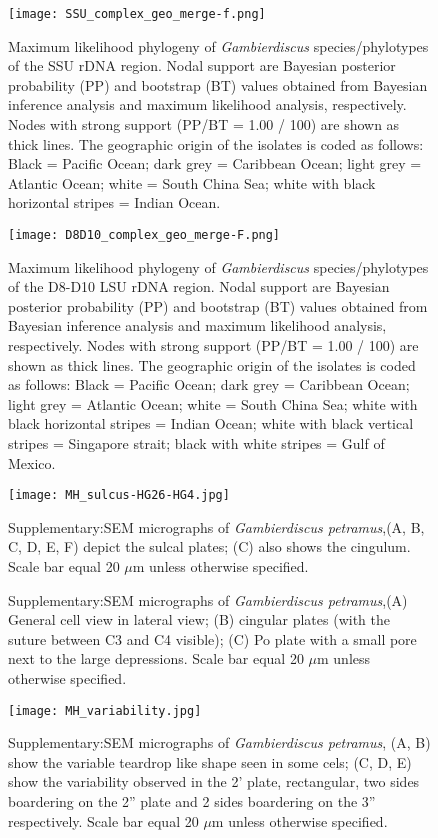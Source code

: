 \documentclass[12pt]{article}
\begin{document}
\begin{figure} 
\texttt{[image: SSU\_complex\_geo\_merge-f.png]} 
\caption{Maximum likelihood phylogeny of \textit{Gambierdiscus} species/phylotypes of the SSU rDNA region. Nodal support are Bayesian posterior probability (PP) and bootstrap (BT) values obtained from Bayesian inference analysis and maximum likelihood analysis, respectively. Nodes with strong support (PP/BT = 1.00 / 100) are shown as thick lines. The geographic origin of the isolates is coded as follows: Black = Pacific Ocean; dark grey = Caribbean Ocean; light grey = Atlantic Ocean; white = South China Sea; white with black horizontal stripes = Indian Ocean.}
\label{fig:HGSSU} 
\end{figure} 
\FloatBarrier 

\newpage
\begin{figure} 
\texttt{[image: D8D10\_complex\_geo\_merge-F.png]} 
\caption{Maximum likelihood phylogeny of \textit{Gambierdiscus} species/phylotypes of the D8-D10 LSU rDNA region. Nodal support are Bayesian posterior probability (PP) and bootstrap (BT) values obtained from Bayesian inference analysis and maximum likelihood analysis, respectively. Nodes with strong support (PP/BT = 1.00 / 100) are shown as thick lines. The geographic origin of the isolates is coded as follows: Black = Pacific Ocean; dark grey = Caribbean Ocean; light grey = Atlantic Ocean; white = South China Sea; white with black horizontal stripes = Indian Ocean; white with black vertical stripes = Singapore strait; black with white stripes = Gulf of Mexico.} 
\label{fig:HGD8D10}
\end{figure} 
\FloatBarrier 
\FloatBarrier 
\begin{figure} 
\texttt{[image: MH\_sulcus-HG26-HG4.jpg]} 
\caption{Supplementary:SEM micrographs of \emph{Gambierdiscus petramus},(A, B, C, D, E, F) depict the sulcal plates; (C) also shows the cingulum. Scale bar equal 20 $\mu$m unless otherwise specified.} 
\label{fig:sulcSEM}
\end{figure} 
\FloatBarrier
\FloatBarrier 
\begin{figure} 
\caption{Supplementary:SEM micrographs of \emph{Gambierdiscus petramus},(A) General cell view in lateral view; (B) cingular plates (with the suture between C3
and C4 visible); (C) Po plate with a small pore next to the large depressions. Scale bar equal 20 $\mu$m unless otherwise specified.} 
\label{fig:latSEM}
\end{figure} 
\FloatBarrier
\FloatBarrier 
\begin{figure} 
\texttt{[image: MH\_variability.jpg]} 
\caption{Supplementary:SEM micrographs of \emph{Gambierdiscus petramus}, (A, B) show the variable teardrop like shape seen in some cels; (C, D, E) show the variability observed in the 2' plate, rectangular, two sides boardering on the 2'' plate and 2 sides boardering on the 3'' respectively. Scale bar equal 20 $\mu$m unless otherwise specified.} 
\label{fig:varSEM}
\end{figure} 
\FloatBarrier
\newpage


\end{document}
